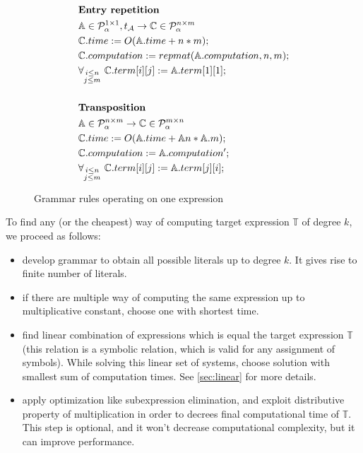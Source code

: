 \begin{figure}
\begin{framed}
\begin{align*}
& \\
&\text{{\bf Entry repetition}}\\
&\mathbb{A} \in \mathcal{P}^{1 \times 1}_\alpha, t_\mathcal{A} \rightarrow \mathbb{C} \in \mathcal{P}^{n \times m}_\alpha \\
&\mathbb{C}.time := O(\mathbb{A}.time + n * m);\\
&\mathbb{C}.computation := repmat(\mathbb{A}.computation, n, m); \\
&\forall_{\substack{i \leq n\\ j \leq m}}\text{ } \mathbb{C}.term[i][j] := \mathbb{A}.term[1][1];\\
& \\
&\text{{\bf Transposition}}\\
&\mathbb{A} \in \mathcal{P}^{n \times m}_\alpha \rightarrow \mathbb{C} \in \mathcal{P}^{m \times n}_\alpha\\
&\mathbb{C}.time := O(\mathbb{A}.time + \mathbb{A}n * \mathbb{A}.m);\\
&\mathbb{C}.computation := \mathbb{A}.computation';\\
&\forall_{\substack{i \leq n\\j \leq m}}\text{ } \mathbb{C}.term[i][j] := \mathbb{A}.term[j][i];
\end{align*}
\caption{Grammar rules operating on one expression}
\label{fig:rules}
\end{framed}
\end{figure}


To find any (or the cheapest) way of computing target expression $\mathbb{T}$ of degree $k$, we proceed as follows: 
\begin{itemize}
\item develop grammar to obtain all possible literals up to degree $k$. It gives rise to finite number of literals. 
\item if there are multiple way of computing the same expression up to multiplicative constant, choose one with shortest time.
\item find linear combination of expressions which is equal the target
  expression $\mathbb{T}$ (this relation is a symbolic relation, which
  is valid for any assignment of symbols). While solving this linear
  set of systems, choose solution with smallest sum of computation
  times. See \ref{sec:linear} for more details.
\item apply optimization like subexpression elimination, and exploit distributive property of multiplication in order to decrees final computational time of $\mathbb{T}$. This step is optional, and it won't decrease computational complexity, but it can improve performance.
\end{itemize}

